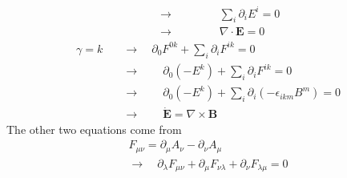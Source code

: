 \documentclass[10pt,a4paper]{book}
\theoremstyle{definition}
\begin{document}
\begin{enumerate}[(a)]
\begin{align}
&\quad\rightarrow\qquad\qquad\sum_i\partial_iE^i=0\\
&\quad\rightarrow\qquad\qquad\nabla\cdot\mathbf{E}=0
\end{align}
\begin{align}
\gamma=k
&\quad\rightarrow\quad\partial_0F^{0k}+\sum_i\partial_iF^{ik}=0\\
&\quad\rightarrow\qquad\partial_0(-E^k)+\sum_i\partial_iF^{ik}=0\\
&\quad\rightarrow\qquad\partial_0(-E^k)+\sum_i\partial_i(-\epsilon_{ikm}B^m)=0\\
&\quad\rightarrow\qquad\dot{\mathbf{E}}=\nabla\times\mathbf{B}
\end{align}
The other two equations come from
\begin{align}
F_{\mu\nu}=\partial_\mu A_\nu-\partial_\nu A_\mu\\
\rightarrow\quad \partial_\lambda F_{\mu\nu}+\partial_\mu F_{\nu\lambda}+\partial_\nu F_{\lambda\mu}=0
\end{align}


\end{enumerate}
\end{document}
